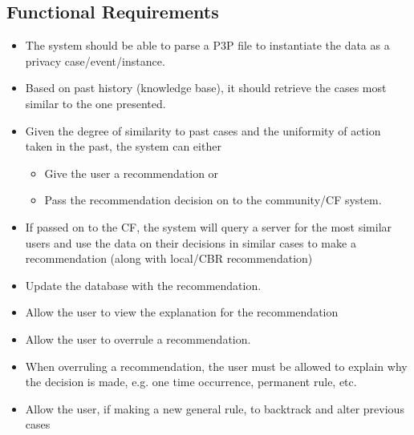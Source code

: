 \subsection{Functional Requirements}
\begin{itemize}

\item The system should be able to parse a P3P file to instantiate the data as a privacy case/event/instance.
\item Based on past history (knowledge base), it should retrieve the cases most similar to the one presented.
\item Given the degree of similarity to past cases and the uniformity of action taken in the past, the system can either 
  \begin{itemize}
  \item Give the user a recommendation or 
  \item Pass the recommendation decision on to the community/CF system.
  \end{itemize}
\item If passed on to the CF, the system will query a server for the most similar users and use the data on their decisions in similar cases to make a recommendation (along with local/CBR recommendation) 
\item Update the database with the recommendation.
\item Allow the user to view the explanation for the recommendation
\item Allow the user to overrule a recommendation. 
\item When overruling a recommendation, the user must be allowed to explain why the decision is made, e.g. one time occurrence, permanent rule, etc.	
\item Allow the user, if making a new general rule, to backtrack and alter previous cases
\end{itemize}

